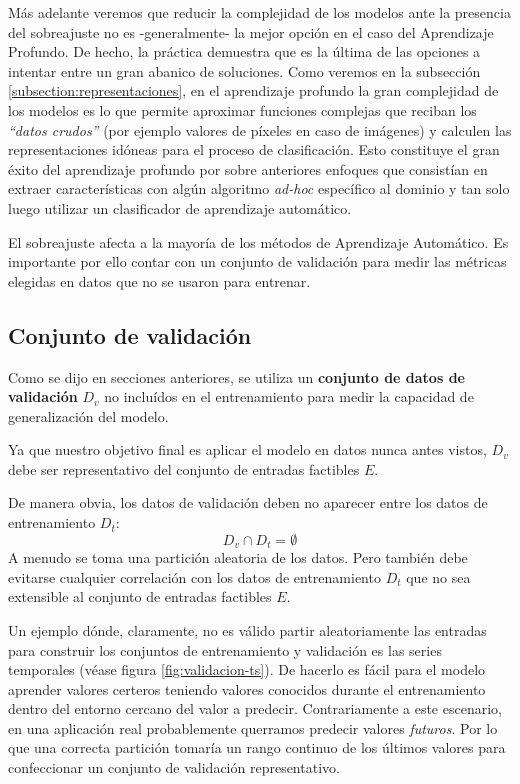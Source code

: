 Más adelante veremos que reducir la complejidad de los modelos ante la presencia del sobreajuste no es -generalmente- la mejor opción en el caso del Aprendizaje Profundo. De hecho, la práctica demuestra que es la última de las opciones a intentar entre un gran abanico de soluciones. Como veremos en la subsección \ref{subsection:representaciones}, en el aprendizaje profundo la gran complejidad de los modelos es lo que permite aproximar funciones complejas que reciban los \textit{``datos crudos''} (por ejemplo valores de píxeles en caso de imágenes) y calculen las representaciones idóneas para el proceso de clasificación. Esto constituye el gran éxito del aprendizaje profundo por sobre anteriores enfoques que consistían en extraer características con algún algoritmo \textit{ad-hoc} específico al dominio y tan solo luego utilizar un clasificador de aprendizaje automático.

El sobreajuste afecta a la mayoría de los métodos de Aprendizaje Automático. Es importante por ello contar con un conjunto de validación para medir las métricas elegidas en datos que no se usaron para entrenar.

\subsection{Conjunto de validación}

Como se dijo en secciones anteriores, se utiliza un \textbf{conjunto de datos de validación} $D_v$ no incluídos en el entrenamiento para medir la capacidad de generalización del modelo. 

Ya que nuestro objetivo final es aplicar el modelo en datos nunca antes vistos, $D_v$ debe ser representativo del conjunto de entradas factibles $E$.

De manera obvia, los datos de validación deben no aparecer entre los datos de entrenamiento $D_t$:
\begin{equation*}
    D_v \cap D_t = \emptyset
\end{equation*}
A menudo se toma una partición aleatoria de los datos. Pero también debe evitarse cualquier correlación con los datos de entrenamiento $D_t$ que no sea extensible al conjunto de entradas factibles $E$.

 Un ejemplo dónde, claramente, no es válido partir aleatoriamente las entradas para construir los conjuntos de entrenamiento y validación es las series temporales (véase figura \ref{fig:validacion-ts}). De hacerlo es fácil para el modelo aprender valores certeros teniendo valores conocidos durante el entrenamiento dentro del entorno cercano del valor a predecir. Contrariamente a este escenario, en una aplicación real probablemente querramos predecir valores \textit{futuros}. Por lo que una correcta partición tomaría un rango continuo de los últimos valores para confeccionar un conjunto de validación representativo.\\


